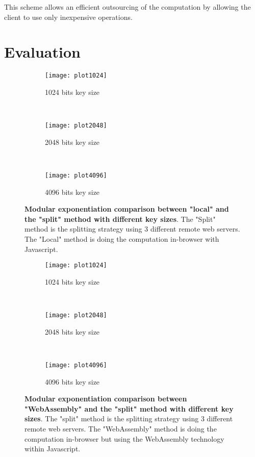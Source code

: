 \documentclass[]{article}
\begin{document}
This scheme allows an efficient outsourcing of the computation by allowing the
client to use only inexpensive operations.

\section{Evaluation} \label{evaluation}

\begin{figure}[ht!]

\centering

\begin{subfigure}[b]{0.8\textwidth}
   \label{fig:plot1024}
   \texttt{[image: plot1024]}
   \caption{1024 bits key size}
\end{subfigure}
~
\begin{subfigure}[b]{0.8\textwidth}
   \label{fig:plot2048}
   \texttt{[image: plot2048]}
   \caption{2048 bits key size}
\end{subfigure}
~
\begin{subfigure}[b]{0.8\textwidth}
   \label{fig:plot4096}
   \texttt{[image: plot4096]}
   \caption{4096 bits key size}
\end{subfigure}

\caption{\textbf{Modular exponentiation comparison between "local" and the
    "split" method with different key sizes}. The "Split" method is the
    splitting strategy using 3 different remote web servers. The "Local" method
    is doing the computation in-browser with Javascript.}

\label{fig:modexp:js}
    
\end{figure}

\begin{figure}[ht!]

\centering

\begin{subfigure}[b]{0.8\textwidth}
   \label{fig:plot1024_wasm}
   \texttt{[image: plot1024]}
   \caption{1024 bits key size}
\end{subfigure}
~
\begin{subfigure}[b]{0.8\textwidth}
   \label{fig:plot2048_wasm}
   \texttt{[image: plot2048]}
   \caption{2048 bits key size}
\end{subfigure}
~
\begin{subfigure}[b]{0.8\textwidth}
   \label{fig:plot4096_wasm}
   \texttt{[image: plot4096]}
   \caption{4096 bits key size}
\end{subfigure}

\caption{\textbf{Modular exponentiation comparison between "WebAssembly" and the
    "split" method with different key sizes}. The "split" method is the
    splitting strategy using 3 different remote web servers. The "WebAssembly" method
    is doing the computation in-browser but using the WebAssembly technology
    within Javascript.}

\label{fig:modexp:wasm}
    
\end{figure}
\end{document}
